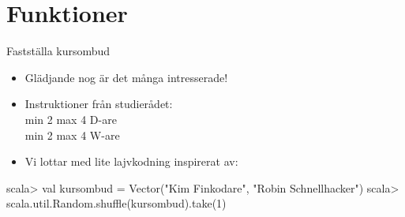 \documentclass{lecturenotes}
\renewcommand{\vecka}{3}
\newcommand{\veckotema}{Funktioner}
\begin{document}
\frame{\titlepage}
\setnextsection{\vecka}
\section[Vecka \vecka: \veckotema]{\veckotema}
\frame{\tableofcontents}

\ifkompendium\else

\begin{Slide}{Fastställa kursombud}
\begin{itemize}
\item Glädjande nog är det många intresserade!
\item Instruktioner från studierådet: \\ min 2 max 4 D-are \\ min 2 max 4 W-are
\item Vi lottar med lite lajvkodning inspirerat av:
\end{itemize}
\begin{REPL}
scala> val kursombud = Vector("Kim Finkodare", "Robin Schnellhacker")
scala> scala.util.Random.shuffle(kursombud).take(1)
\end{REPL}
\end{Slide}


\fi
\end{document}
